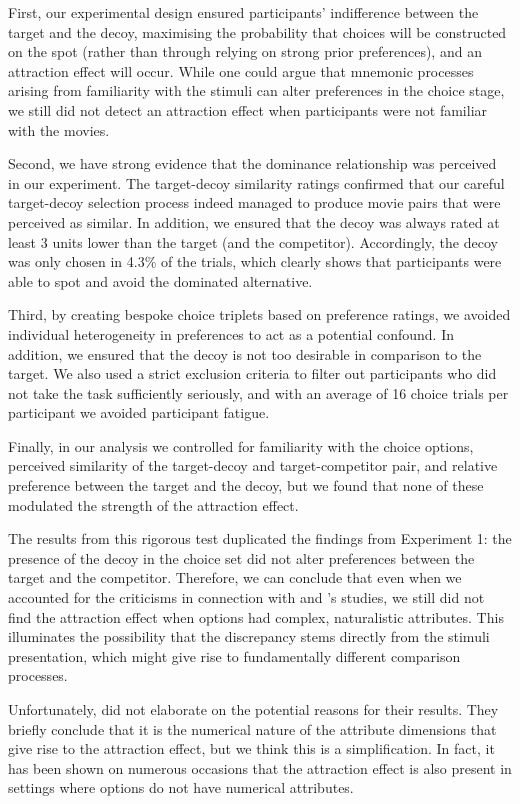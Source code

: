 \documentclass[11pt,a4paper]{article}
\begin{document}
First, our experimental design ensured participants' indifference between the target and the decoy, maximising the probability that choices will be constructed on the spot (rather than through relying on strong prior preferences), and an attraction effect will occur. While one could argue that mnemonic processes arising from familiarity with the stimuli can alter preferences in the choice stage, we still did not detect an attraction effect when participants were not familiar with the movies. 

Second, we have strong evidence that the dominance relationship was perceived in our experiment. The target-decoy similarity ratings confirmed that our careful target-decoy selection process indeed managed to produce movie pairs that were perceived as similar. In addition, we ensured that the decoy was always rated at least 3 units lower than the target (and the competitor). Accordingly, the decoy was only chosen in 4.3\% of the trials, which clearly shows that participants were able to spot and avoid the dominated alternative.

Third, by creating bespoke choice triplets based on preference ratings, we avoided individual heterogeneity in preferences to act as a potential confound. In addition, we ensured that the decoy is not too desirable in comparison to the target. We also used a strict exclusion criteria to filter out participants who did not take the task sufficiently seriously, and with an average of 16 choice trials per participant we avoided participant fatigue.


Finally, in our analysis we controlled for familiarity with the choice options, perceived similarity of the target-decoy and target-competitor pair, and relative preference between the target and the decoy, but we found that none of these modulated the strength of the attraction effect.

The results from this rigorous test duplicated the findings from Experiment 1: the presence of the decoy in the choice set did not alter preferences between the target and the competitor. Therefore, we can conclude that even when we accounted for the criticisms in connection with \citeauthor{Frederick2014} and \citeauthor{Yang2014}'s studies, we still did not find the attraction effect when options had complex, naturalistic attributes. This illuminates the possibility that the discrepancy stems directly from the stimuli presentation, which might give rise to fundamentally different comparison processes.

Unfortunately, \citeauthor{Frederick2014} did not elaborate on the potential reasons for their results. They briefly conclude that it is the numerical nature of the attribute dimensions that give rise to the attraction effect, but we think this is a simplification. In fact, it has been shown on numerous occasions that the attraction effect is also present in settings where options do not have numerical attributes. 
\end{document}
